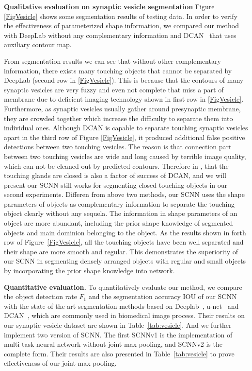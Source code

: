 \noindent\textbf{Qualitative evaluation on synaptic vesicle segmentation}
Figure \ref{FigVesicle} shows some segmentation results of testing data.
In order to verify the effectiveness of parameterized shape information, we compared our method with DeepLab \cite{Chen2014a} without any complementary information and DCAN~\cite{Chen2016a} that uses auxiliary contour map.

From segmentation results we can see that without other complementary information, there exists many touching objects that cannot be separated by DeepLab (second row in \ref{FigVesicle}).
This is because that the contours of many synaptic vesicles are very fuzzy and even not complete that miss a part of membrane due to deficient imaging technology shown in first row in \ref{FigVesicle}.
Furthermore, as synaptic vesicles usually gather around presynaptic membrane, they are crowded together which increase the difficulty to separate them into individual ones.
Although DCAN is capable to separate touching synaptic vesicles apart in the third row of Figure \ref{FigVesicle}, it produced additional false positive detections between two touching vesicles.
The reason is that connection part between two touching vesicles are wide and long caused by terrible image quality, which can not be cleaned out by predicted contours.
Therefore in \cite{Chen2016a}, that the touching glands are closed is also a factor of success of DCAN, and we will present our SCNN still works for segmenting closed touching objects in our second experiments.
Differen from above two methods, our SCNN uses the shape parameters of objects as complementary information to separate the touching object clearly without any sequela.
The information in shape parameters of an object are more abundant, including the prior shape knowledge of segmented objects and main dominion belonging to the object.
As the results shown in forth row of Figure~\ref{FigVesicle}, all the touching objects have been well separated and their shape are more smooth and regular.
This demonstrates the superiority of our SCNN in segmenting densely arranged objects with regular and small objects by incorporating the prior shape knowledge into network.

\noindent\textbf{Quantitative evaluation.}
To quantitatively evaluate our method, we compare the object detection rate $F_1$ and the segmentation accuracy IOU of our SCNN with the state of the art segmentation methods based on Deeplab~\cite{Chen2014a}, u-net~\cite{Ronneberger2015} and DCAN~\cite{Chen2016b}, which are commonly used in biomedical image process.
%
Their results on our synaptic vesicle dataset are shown in Table~\ref{tab:vesicle}.
%
And we further implement two version of SCNN.
The first SCNNv1 is the implementation of multi-task neural network without joint max pooling, and SCNNv2 is the complete form.
Their results are also presented in Table~\ref{tab:vesicle} to prove effectiveness of our joint max pooling.

